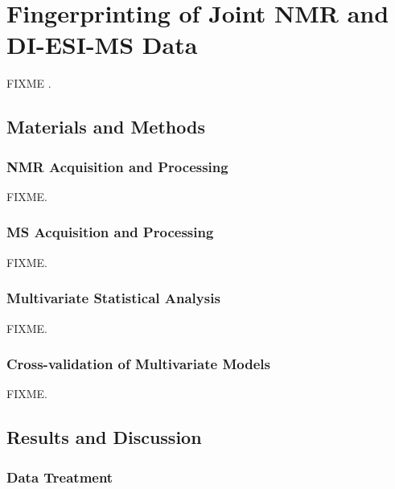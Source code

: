 \section{Fingerprinting of Joint \hnmr{} NMR and DI-ESI-MS Data}

\begin{doublespace}
FIXME \cite{marshall:metab2015}.
\end{doublespace}

\subsection{Materials and Methods}

\subsubsection{NMR Acquisition and Processing}

\begin{doublespace}
FIXME.
\end{doublespace}

\subsubsection{MS Acquisition and Processing}

\begin{doublespace}
FIXME.
\end{doublespace}

\subsubsection{Multivariate Statistical Analysis}

\begin{doublespace}
FIXME.
\end{doublespace}

\subsubsection{Cross-validation of Multivariate Models}

\begin{doublespace}
FIXME.
\end{doublespace}

\subsection{Results and Discussion}

\subsubsection{Data Treatment}

